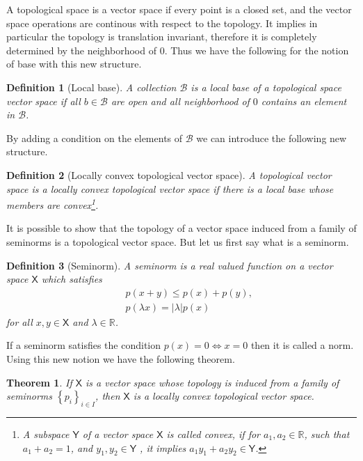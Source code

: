 \documentclass[10pt]{book}
\newcommand{\abs}[1]{\left|#1\right|}
\newcommand{\Bcal}{\mathcal{B}}
\newcommand{\Rbb}{\mathbb{R}}
\newcommand{\Xsf}{\mathsf{X}}
\newcommand{\Ysf}{\mathsf{Y}}
\theoremstyle{break}
\newtheorem{theorem}{Theorem}
\newtheorem{definition}{Definition}
\begin{document}
\bigskip


A topological space is a vector space if every point is a closed set, and the vector space operations are continous with respect to the topology. It implies in particular the topology is translation invariant, therefore it is completely determined by the neighborhood of $0$. Thus we have the following for the notion of base with this new structure.


\begin{definition}[Local base]
A collection $\Bcal$ is a local base of a  topological space vector space if all $b \in \Bcal$ are open and all neighborhood of $0$ contains an element in $\Bcal$.
\end{definition}


By adding a condition on the elements of $\Bcal$ we can introduce the following new structure.


\begin{definition}[Locally convex topological vector space]
A topological vector space is a locally convex topological vector space if there is a local base whose members are convex\footnote{A subspace $\Ysf$ of a vector space $\Xsf$ is called convex, if for $a_1, a_2 \in \Rbb$, such that $a_1 + a_2 = 1$, and $y_1, y_2 \in \Ysf$ , it implies $a_1 y_1 + a_2 y_2 \in \Ysf$.}.
\end{definition}


It is possible to show that the topology of a vector space induced from a family of seminorms is a topological vector space. But let us first say what is a seminorm.


\begin{definition}[Seminorm]
A seminorm is a real valued function on a vector space $\Xsf$ which satisfies 
%
\begin{eqnarray*}
&& p(x+y) \leq p(x) + p(y) , \\
&& p(\lambda x) = \abs{\lambda} p(x)
\end{eqnarray*}
%
for all $x,y \in \Xsf$ and $\lambda \in \Rbb$.
\end{definition}


If a seminorm satisfies the condition $p(x)=0 \Leftrightarrow x=0$ then it is called a norm. Using this new notion we have the following theorem.


\begin{theorem}
If $\Xsf$ is a vector space whose topology is induced from a family of seminorms $\left\{ p_i  \right\}_{i\in I}$, then $\Xsf$ is a locally convex topological vector space.
\end{theorem}
\end{document}
